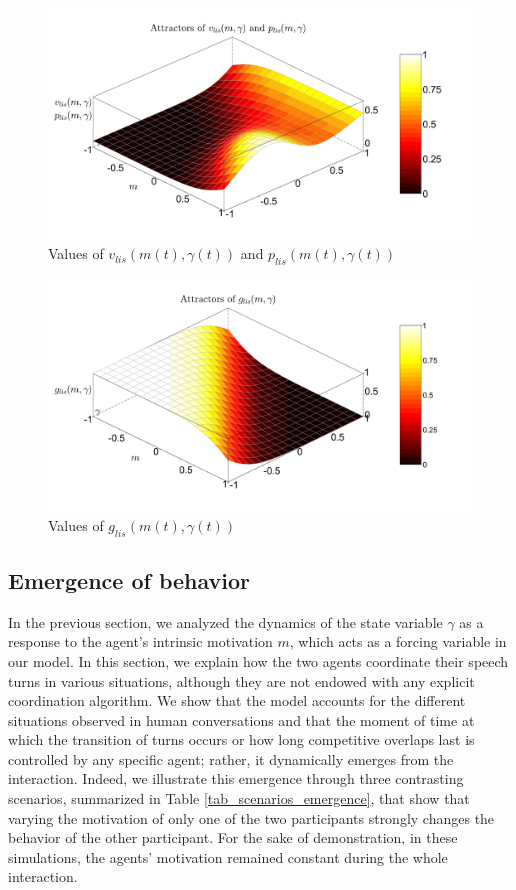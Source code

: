\documentclass[twocolumn]{svjour3}
\begin{document}
\begin{figure}
  \centering
  \includegraphics[width=\linewidth]{figure/bifurcProsodyLis.pdf}
  \caption{Values of $v_{lis}(m(t),\gamma(t))$ and $p_{lis}(m(t),\gamma(t))$}
  \label{fig_pro_lis}
\end{figure}

\begin{figure}
  \centering
  \includegraphics[width=\linewidth]{figure/gazeLis.pdf}
  \caption{Values of $g_{lis}(m(t),\gamma(t))$}
  \label{fig_gaze_lis}
\end{figure}

\subsection{Emergence of behavior}

In the previous section, we analyzed the dynamics of the state variable $\gamma$ as a response to the agent's intrinsic motivation $m$, which acts as a forcing variable in our model. In this section, we explain how the two agents coordinate their speech turns in various situations, although they are not endowed with any explicit coordination algorithm. We show that the model accounts for the different situations observed in human conversations and that the moment of time at which the transition of turns occurs or how long competitive overlaps last is  controlled by any specific agent; rather, it dynamically emerges from the interaction. Indeed, we illustrate this emergence through three contrasting scenarios, summarized in Table \ref{tab_scenarios_emergence}, that show that varying the motivation of only one of the two participants strongly changes the behavior of the other participant. For the sake of demonstration, in these simulations, the agents' motivation remained constant during the whole interaction. 
\end{document}
